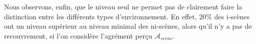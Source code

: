 \documentclass[twoside,twocolumn]{article}
\begin{document}
Nous observons, enfin, que le niveau seul ne permet pas de clairement faire la distinction entre les différents types d'environnement. En effet, $20\%$ des i-scènes ont un niveau supérieur au niveau minimal des ni-scènes, alors qu'il n'y a pas de recouvrement, si l'on considère l'agrément perçu $\mathcal{A}_{scene}$.

\begin{figure}[t]
        \myfloatalign
        \par

\end{figure}
\end{document}
